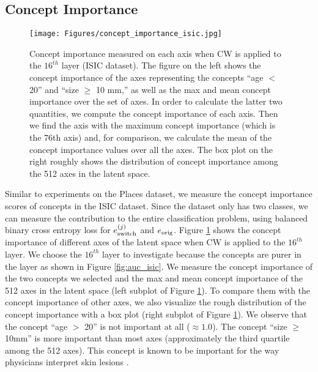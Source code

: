 \documentclass{article}
\begin{document}
\subsection{Concept Importance}
\label{sec:concept_importance_isic}

\begin{figure}[ht]
    \centering
    \texttt{[image: Figures/concept\_importance\_isic.jpg]}
    \caption{Concept importance measured on each axis when CW is applied to the $16^{th}$ layer (ISIC dataset). The figure on the left shows the concept importance of the axes representing the concepts ``age $<$ 20'' and ``size $\geq$ 10 mm,'' as well as the max and mean concept importance over the set of axes. In order to calculate the latter two quantities, we compute the concept importance of each axis. Then we find the axis with the maximum concept importance (which is the 76th axis) and, for comparison, we calculate the mean of the concept importance values over all the axes. The box plot on the right roughly shows the distribution of concept importance among the 512 axes in the latent space.}
    \label{fig:concept_importance_isic}
\end{figure}

Similar to experiments on the Places dataset, we measure the concept importance scores of concepts in the ISIC dataset. Since the dataset only has two classes, we can measure the contribution to the entire classification problem, using balanced binary cross entropy loss for $e^{(j)}_{\rm switch}$ and $e_{\rm orig}$. Figure \ref{fig:concept_importance_isic} shows the concept importance of different axes of the latent space when CW is applied to the $16^{th}$ layer. We choose the $16^{th}$ layer to investigate because the concepts are purer in the layer as shown in Figure \ref{fig:auc_isic}. We measure the concept importance of the two concepts we selected and the max and mean concept importance of the 512 axes in the latent space (left subplot of Figure \ref{fig:concept_importance_isic}). To compare them with the concept importance of other axes, we also visualize the rough distribution of the concept importance with a box plot (right subplot of Figure \ref{fig:concept_importance_isic}). We observe that the concept ``age $>$ 20'' is not important at all ($\approx 1.0$). The concept ``size $\geq$ 10mm'' is more important than most axes (approximately the third quartile among the 512 axes). This concept is known to be important for the way physicians interpret skin lesions \cite{walter2013using}. 
\end{document}
